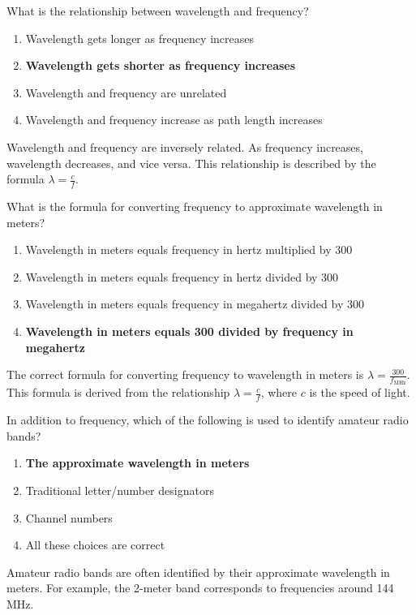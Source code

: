 
\begin{tcolorbox}[colback=gray!10!white,colframe=black!75!black,title={T3B05}]
    What is the relationship between wavelength and frequency?
    \begin{enumerate}[label=\Alph*,noitemsep]
        \item Wavelength gets longer as frequency increases
        \item \textbf{Wavelength gets shorter as frequency increases}
        \item Wavelength and frequency are unrelated
        \item Wavelength and frequency increase as path length increases
    \end{enumerate}
\end{tcolorbox}
Wavelength and frequency are inversely related. As frequency increases, wavelength decreases, and vice versa. This relationship is described by the formula $\lambda = \frac{c}{f}$.


\begin{tcolorbox}[colback=gray!10!white,colframe=black!75!black,title={T3B06}]
    What is the formula for converting frequency to approximate wavelength in meters?
    \begin{enumerate}[label=\Alph*,noitemsep]
        \item Wavelength in meters equals frequency in hertz multiplied by 300
        \item Wavelength in meters equals frequency in hertz divided by 300
        \item Wavelength in meters equals frequency in megahertz divided by 300
        \item \textbf{Wavelength in meters equals 300 divided by frequency in megahertz}
    \end{enumerate}
\end{tcolorbox}
The correct formula for converting frequency to wavelength in meters is $\lambda = \frac{300}{f_{\text{MHz}}}$. This formula is derived from the relationship $\lambda = \frac{c}{f}$, where $c$ is the speed of light.


\begin{tcolorbox}[colback=gray!10!white,colframe=black!75!black,title={T3B07}]
    In addition to frequency, which of the following is used to identify amateur radio bands?
    \begin{enumerate}[label=\Alph*,noitemsep]
        \item \textbf{The approximate wavelength in meters}
        \item Traditional letter/number designators
        \item Channel numbers
        \item All these choices are correct
    \end{enumerate}
\end{tcolorbox}
Amateur radio bands are often identified by their approximate wavelength in meters. For example, the 2-meter band corresponds to frequencies around 144 MHz.

